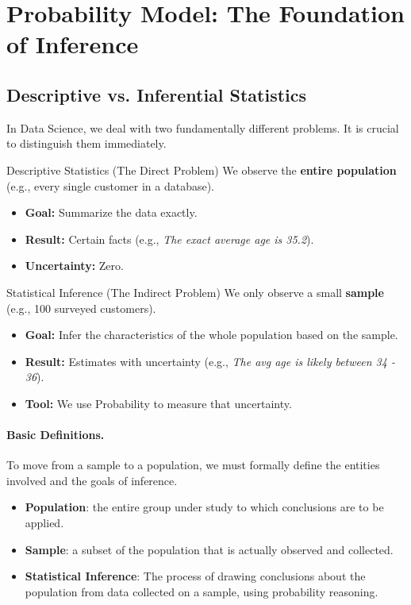 \section{Probability Model: The Foundation of Inference}

\subsection{Descriptive vs. Inferential Statistics}

In Data Science, we deal with two fundamentally different problems. It is crucial to distinguish them immediately.

\begin{defbox}{Descriptive Statistics (The Direct Problem)}
We observe the \textbf{entire population} (e.g., every single customer in a database).
\begin{itemize}
    \item \textbf{Goal:} Summarize the data exactly.
    \item \textbf{Result:} Certain facts (e.g., \textit{The exact average age is 35.2}).
    \item \textbf{Uncertainty:} Zero.
\end{itemize}
\end{defbox}

\begin{defbox}{Statistical Inference (The Indirect Problem)}
We only observe a small \textbf{sample} (e.g., 100 surveyed customers).
\begin{itemize}
    \item \textbf{Goal:} Infer the characteristics of the whole population based on the sample.
    \item \textbf{Result:} Estimates with uncertainty (e.g., \textit{The avg age is likely between 34 - 36}).
    \item \textbf{Tool:} We use Probability to measure that uncertainty.
\end{itemize}
\end{defbox}

\paragraph{Basic Definitions. }

To move from a sample to a population, we must formally define the entities involved and the goals of inference.
\begin{itemize}[label=$\cdot$]
    \item \textbf{Population}: the entire group under study to which conclusions are to be applied.
    \item \textbf{Sample}: a subset of the population that is actually observed and collected.
    \item \textbf{Statistical Inference}: The process of drawing conclusions about the population from data collected on a sample, using probability reasoning.
\end{itemize}

